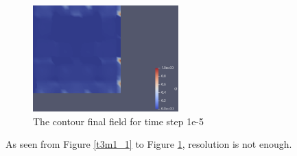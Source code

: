 \documentclass{article}
\begin{document}
\begin{figure}[hbt!]
    \centering
    \includegraphics[width=0.5\textwidth]{Figures/e-5 20x20/contour.png}
    \caption{The contour final field for time step 1e-5}
    \label{t3m1_2} 
\end{figure}

As seen from Figure \ref{t3m1_1} to Figure \ref{t3m1_2}, resolution is not enough. 


\clearpage
\end{document}
